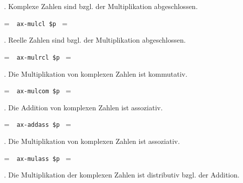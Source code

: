 . Komplexe Zahlen sind bzgl. der Multiplikation abgeschlossen.

\setbox\startprefix=\hbox{\tt \ \ ax-mulcl\ \$p\ }
\setbox\contprefix=\hbox{\tt \ \ \ \ \ \ \ \ \ \ \ \ \ }
\startm
\m{\vdash}\m{(}\m{(}\m{\in}\m{\wedge}\m{\in}%
\m{)}\m{\rightarrow}\m{(}\m{\cdot}\m{)}\m{\in}\m{)}
\endm

. Reelle Zahlen sind bzgl. der Multiplikation abgeschlossen.

\setbox\startprefix=\hbox{\tt \ \ ax-mulrcl\ \$p\ }
\setbox\contprefix=\hbox{\tt \ \ \ \ \ \ \ \ \ \ \ \ \ \ }
\startm
\m{\vdash}\m{(}\m{(}\m{\in}\m{\wedge}\m{\in}%
\m{)}\m{\rightarrow}\m{(}\m{\cdot}\m{)}\m{\in}\m{)}
\endm

. Die Multiplikation von komplexen Zahlen ist kommutativ.

\setbox\startprefix=\hbox{\tt \ \ ax-mulcom\ \$p\ }
\setbox\contprefix=\hbox{\tt \ \ \ \ \ \ \ \ \ \ \ \ \ \ }
\startm
\m{\vdash}\m{(}\m{(}\m{\in}\m{\wedge}\m{\in}%
\m{)}\m{\rightarrow}\m{(}\m{\cdot}\m{)}\m{=}\m{(}\m{\cdot}%
\m{)}\m{)}
\endm

. Die Addition von komplexen Zahlen ist assoziativ.

\setbox\startprefix=\hbox{\tt \ \ ax-addass\ \$p\ }
\setbox\contprefix=\hbox{\tt \ \ \ \ \ \ \ \ \ \ \ \ \ \ }
\startm
\m{\vdash}\m{(}\m{(}\m{\in}\m{\wedge}\m{\in}%
\m{\wedge}\m{\in}\m{)}\m{\rightarrow}\m{(}\m{(}\m{+}%
\m{)}\m{+}\m{)}\m{=}\m{(}\m{+}\m{(}\m{+}\m{)}\m{)}%
\m{)}
\endm

. Die Multiplikation von komplexen Zahlen ist assoziativ.

\setbox\startprefix=\hbox{\tt \ \ ax-mulass\ \$p\ }
\setbox\contprefix=\hbox{\tt \ \ \ \ \ \ \ \ \ \ \ \ \ \ }
\startm
\m{\vdash}\m{(}\m{(}\m{\in}\m{\wedge}\m{\in}%
\m{\wedge}\m{\in}\m{)}\m{\rightarrow}\m{(}\m{(}\m{\cdot}%
\m{)}\m{\cdot}\m{)}\m{=}\m{(}\m{\cdot}\m{(}\m{\cdot}%
\m{)}\m{)}\m{)}
\endm

. Die Multiplikation der komplexen Zahlen ist distributiv bzgl. der Addition.

